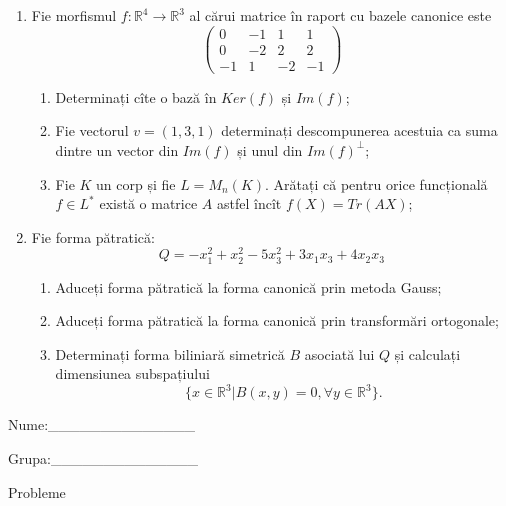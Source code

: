 \documentclass{article}
\begin{document}
\begin{enumerate}
 \item Fie morfismul $f:\mathbb{R}^4 \to \mathbb{R}^3$ al cărui matrice în raport cu bazele canonice este
$$\begin{pmatrix}
0&-1&1&1\\
0&-2&2&2\\
-1&1&-2&-1
\end{pmatrix}$$

\begin{enumerate}
\item Determinați cîte o bază în $Ker(f)$ și $Im(f)$;
\item Fie vectorul $v=(1,3,1)$ determinați descompunerea acestuia ca suma dintre un vector din $Im(f)$ și unul din $Im(f)^\perp$;
\item Fie $K$ un corp și fie $L=M_n(K)$. Arătați că pentru orice funcțională $f \in L^*$ există o matrice $A$ astfel încît $f(X)=Tr(AX)$;
\end{enumerate}
\item Fie forma pătratică:
$$Q= -x_1^2+x_2^2-5x_3^2+3x_1x_3+4x_2x_3$$

\begin{enumerate}
\item Aduceți forma pătratică la forma canonică prin metoda Gauss;
\item Aduceți forma pătratică la forma canonică prin transformări ortogonale;
\item Determinați forma biliniară simetrică $B$ asociată lui $Q$ și calculați dimensiunea subspațiului
$$\{x \in \mathbb{R}^3 | B(x,y)=0,\forall y \in \mathbb{R}^3\}.$$

\end{enumerate}
\end{enumerate}
\newpage
\begin{flushright}
Nume:\_\_\_\_\_\_\_\_\_\_\_\_\_\_
 
 
Grupa:\_\_\_\_\_\_\_\_\_\_\_\_\_\_
\end{flushright}
\begin{center}
\vspace{2cm}
{\Large Probleme}
\vspace{2cm}
\end{center}
\end{document}
